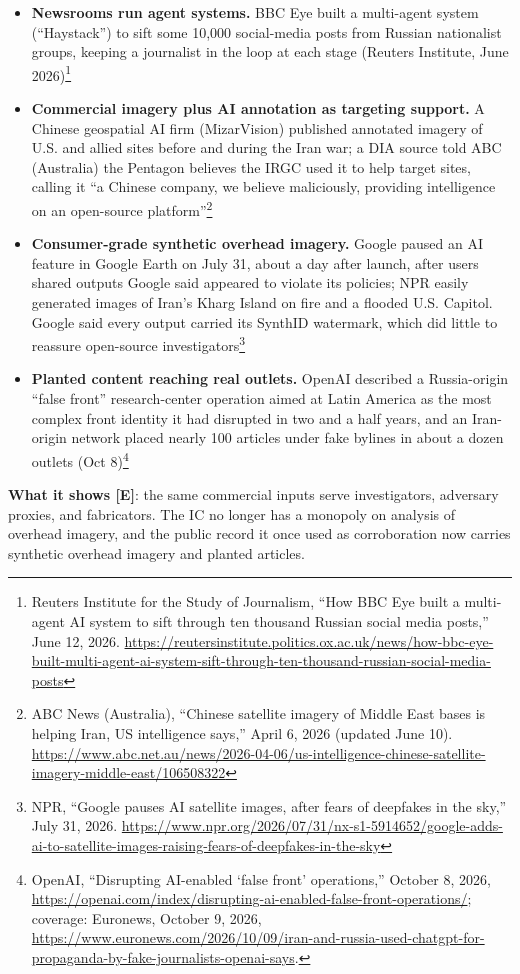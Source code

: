 \documentclass[11pt,letterpaper]{article}
\begin{document}
\begin{keybox}
\begin{itemize}[nosep]
  \item \textbf{Newsrooms run agent systems.} BBC Eye built a multi-agent system (``Haystack'') to sift some 10,000 social-media posts from Russian nationalist groups, keeping a journalist in the loop at each stage (Reuters Institute, June 2026)\footnote{Reuters Institute for the Study of Journalism, ``How BBC Eye built a multi-agent AI system to sift through ten thousand Russian social media posts,'' June 12, 2026. \url{https://reutersinstitute.politics.ox.ac.uk/news/how-bbc-eye-built-multi-agent-ai-system-sift-through-ten-thousand-russian-social-media-posts}}
  \item \textbf{Commercial imagery plus AI annotation as targeting support.} A Chinese geospatial AI firm (MizarVision) published annotated imagery of U.S. and allied sites before and during the Iran war; a DIA source told ABC (Australia) the Pentagon believes the IRGC used it to help target sites, calling it ``a Chinese company, we believe maliciously, providing intelligence on an open-source platform''\footnote{ABC News (Australia), ``Chinese satellite imagery of Middle East bases is helping Iran, US intelligence says,'' April 6, 2026 (updated June 10). \url{https://www.abc.net.au/news/2026-04-06/us-intelligence-chinese-satellite-imagery-middle-east/106508322}}
  \item \textbf{Consumer-grade synthetic overhead imagery.} Google paused an AI feature in Google Earth on July 31, about a day after launch, after users shared outputs Google said appeared to violate its policies; NPR easily generated images of Iran's Kharg Island on fire and a flooded U.S. Capitol. Google said every output carried its SynthID watermark, which did little to reassure open-source investigators\footnote{NPR, ``Google pauses AI satellite images, after fears of deepfakes in the sky,'' July 31, 2026. \url{https://www.npr.org/2026/07/31/nx-s1-5914652/google-adds-ai-to-satellite-images-raising-fears-of-deepfakes-in-the-sky}}
  \item \textbf{Planted content reaching real outlets.} OpenAI described a Russia-origin ``false front'' research-center operation aimed at Latin America as the most complex front identity it had disrupted in two and a half years, and an Iran-origin network placed nearly 100 articles under fake bylines in about a dozen outlets (Oct 8)\footnote{OpenAI, ``Disrupting AI-enabled `false front' operations,'' October 8, 2026, \url{https://openai.com/index/disrupting-ai-enabled-false-front-operations/}; coverage: Euronews, October 9, 2026, \url{https://www.euronews.com/2026/10/09/iran-and-russia-used-chatgpt-for-propaganda-by-fake-journalists-openai-says}.}
\end{itemize}
\textbf{What it shows [E]}: the same commercial inputs serve investigators, adversary proxies, and fabricators. The IC no longer has a monopoly on analysis of overhead imagery, and the public record it once used as corroboration now carries synthetic overhead imagery and planted articles.
\end{keybox}
\end{document}
